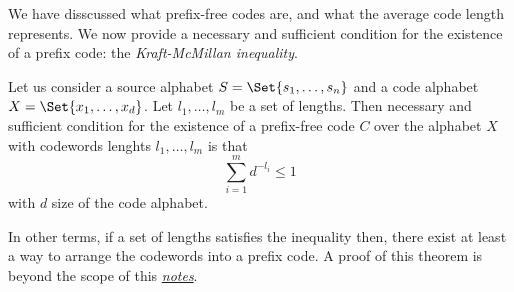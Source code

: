 \documentclass{subfiles}
\begin{document}
    We have disscussed what prefix-free codes are, 
        and what the average code length represents.
    We now provide a necessary and sufficient condition for the existence of 
    a prefix code: the \emph{Kraft-McMillan inequality}.
    \begin{theorem}\label{Thm:2}
        Let us consider a source alphabet \(S = \Set{s_{1}, \ldots, s_{n}}\)
        and a code alphabet \(X =\Set{x_{1}, \ldots, x_{d}}\).
        Let \(l_{1}, \ldots, l_{m}\) be a set of lengths.
        Then necessary and sufficient condition for the existence of a 
        prefix-free code \(C\) over the alphabet \(X\) with codewords lenghts 
        \(l_{1}, \ldots, l_{m}\) is that 
        \[
            \sum_{i = 1}^{m}{d^{-l_{i}}} \le 1
        \]
        with \(d\) size of the code alphabet.
    \end{theorem}
    In other terms, if a set of lengths satisfies the inequality then,
        there exist at least a way to arrange the codewords into a prefix code.
    A proof of this theorem is beyond the scope of this \underline{\em notes}.
\end{document}
